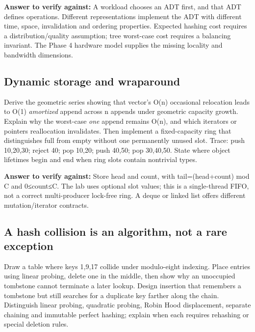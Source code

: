 \textbf{Answer to verify against:} A workload chooses an ADT first, and that ADT defines operations. Different representations implement the ADT with different time, space, invalidation and ordering properties. Expected hashing cost requires a distribution/quality assumption; tree worst-case cost requires a balancing invariant. The Phase 4 hardware model supplies the missing locality and bandwidth dimensions.

\subsection{Dynamic storage and wraparound}\label{appendix-8a046b38375e-dynamic-storage-and-wraparound}

\hypertarget{appendix-8a046b38375e-dynamic-storage-and-wraparound}{}

Derive the geometric series showing that vector's O(n) occasional relocation leads to O(1) \emph{amortized} append across n appends under geometric capacity growth. Explain why the worst-case \emph{one} append remains O(n), and which iterators or pointers reallocation invalidates. Then implement a fixed-capacity ring that distinguishes full from empty without one permanently unused slot. Trace: push 10,20,30; reject 40; pop 10,20; push 40,50; pop 30,40,50. State where object lifetimes begin and end when ring slots contain nontrivial types.

\textbf{Answer to verify against:} Store head and count, with tail=(head+count) mod C and 0≤count≤C. The lab uses optional slot values; this is a single-thread FIFO, not a correct multi-producer lock-free ring. A deque or linked list offers different mutation/iterator contracts.

\subsection{A hash collision is an algorithm, not a rare exception}\label{appendix-8a046b38375e-a-hash-collision-is-an-algorithm-not-a-rare-exception}

\hypertarget{appendix-8a046b38375e-a-hash-collision-is-an-algorithm-not-a-rare-exception}{}

Draw a table where keys 1,9,17 collide under modulo-eight indexing. Place entries using linear probing, delete one in the middle, then show why an unoccupied tombstone cannot terminate a later lookup. Design insertion that remembers a tombstone but still searches for a duplicate key farther along the chain. Distinguish linear probing, quadratic probing, Robin Hood displacement, separate chaining and immutable perfect hashing; explain when each requires rehashing or special deletion rules.

